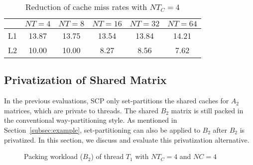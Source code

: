 \begin{table}
  \centering
  \caption{Reduction of cache miss rates with $NT_C=4$}
  \label{tab:papi}
  \setlength{\tabcolsep}{3.5pt}
  \begin{tabular}{lccccc}
    \toprule
     & $NT=4$ & $NT=8$ & $NT=16$ & $NT=32$ & $NT=64$ \\
    \midrule
    L1     & 13.87 & 13.75 & 13.54 & 13.84 & 14.21 \\
    L2     & 10.00 & 10.00 & 8.27 & 8.56 & 7.62 \\
    \bottomrule
  \end{tabular}
\end{table}

\subsection{Privatization of Shared Matrix}\label{subsec:privb}
In the previous evaluations, SCP only set-partitions the shared caches
for $A_2$ matrices, which are private to threads.
The shared $B_2$ matrix is still packed
in the conventional way-partitioning style.
As mentioned in Section~\ref{subsec:example},
set-partitioning can also be applied to $B_2$ after $B_2$ is privatized.
In this section, we discuss and evaluate this privatization alternative.

\begin{figure}
  \centering
  \caption{Packing workload ($B_2$) of thread $T_1$ with $NT_C=4$ and $NC=4$}
  \label{fig:packb}
\end{figure}

